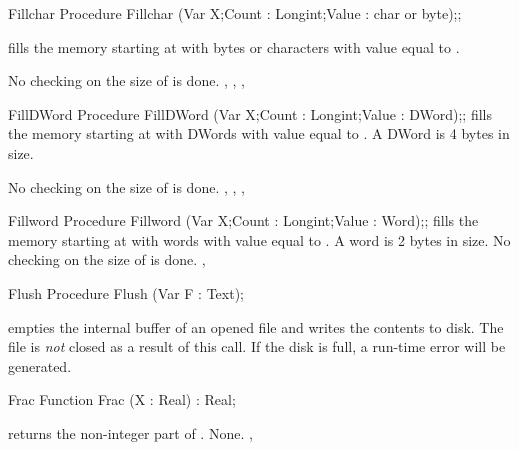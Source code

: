 
\begin{procedure}{Fillchar}
\Declaration
Procedure Fillchar (Var X;Count : Longint;Value : char or byte);;

\Description
{} fills the memory starting at  with  bytes
or characters with value equal to .

\Errors
No checking on the size of  is done.
\SeeAlso
{}, , , 
\end{procedure}


\begin{procedure}{FillDWord}
\Declaration
Procedure FillDWord (Var X;Count : Longint;Value : DWord);;
\Description
{} fills the memory starting at  with  DWords
with value equal to . A DWord is 4 bytes in size.

\Errors
No checking on the size of  is done.
\SeeAlso
{}, , , 
\end{procedure}


\begin{procedure}{Fillword}
\Declaration
Procedure Fillword (Var X;Count : Longint;Value : Word);;
\Description
{} fills the memory starting at  with  words
with value equal to . A word is 2 bytes in size.
\Errors
No checking on the size of  is done.
\SeeAlso
{}, 
\end{procedure}


\begin{procedure}{Flush}
\Declaration
Procedure Flush (Var F : Text);

\Description
{} empties the internal buffer of an opened file  and writes the
contents to disk. The file is \textit{not} closed as a result of this call.
\Errors
If the disk is full, a run-time error will be generated.
\SeeAlso
{}
\end{procedure}


\begin{function}{Frac}
\Declaration
Function Frac (X : Real) : Real;

\Description
{} returns the non-integer part of .
\Errors
None.
\SeeAlso
{}, 
\end{function}

